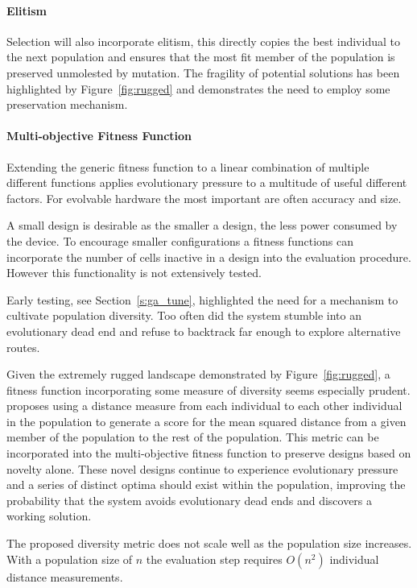 \paragraph{Elitism}

Selection will also incorporate elitism, this directly copies the best individual
to the next population and ensures that the most fit member
of the population is preserved unmolested by mutation. The fragility of potential
solutions has been highlighted by Figure~\ref{fig:rugged} and demonstrates the
need to employ some preservation mechanism.

\paragraph{Multi-objective Fitness Function}

Extending the generic fitness function to a linear combination of multiple different
functions applies evolutionary pressure to a multitude of useful different factors.
For evolvable hardware the most important are often accuracy and size.

A small design is desirable as the smaller a design, the less power consumed
by the device. To encourage smaller configurations a fitness functions can
incorporate the number of cells inactive in a design into the evaluation
procedure. However this functionality is not extensively tested.

Early testing, see Section~\ref{s:ga_tune}, highlighted the need for a mechanism to
cultivate population diversity. Too often did the system stumble into an evolutionary
dead end and refuse to backtrack far enough to explore alternative routes.

Given the extremely rugged landscape demonstrated by Figure~\ref{fig:rugged}, a
fitness function incorporating some measure of diversity seems especially prudent.
\cite{deJong:2001:RBP:2955239.2955241} proposes using a
distance measure from each individual to each other individual in the population
to generate a score for the mean squared distance from a given member of the
population to the rest of the population. This metric can be incorporated into
the multi-objective fitness function to preserve designs based on novelty alone.
These novel designs continue to experience evolutionary pressure and a series
of distinct optima should exist within the population, improving the probability
that the system avoids evolutionary dead ends and discovers a working solution.

The proposed diversity metric does not scale well as the population size increases.
With a population size of $n$ the evaluation step requires $O(n^2)$ individual
distance measurements.

